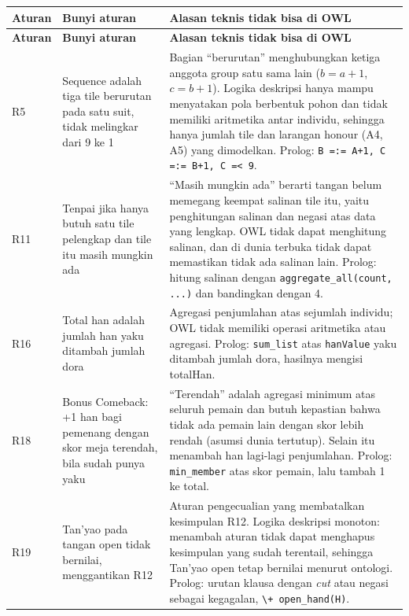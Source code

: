 \documentclass[11pt,a4paper]{article}
\begin{document}
{\small
\begin{longtable}{@{}p{1.4cm} p{5.0cm} p{7.6cm}@{}}
\toprule
\textbf{Aturan} & \textbf{Bunyi aturan} & \textbf{Alasan teknis tidak bisa di OWL} \\
\midrule
\endfirsthead
\toprule
\textbf{Aturan} & \textbf{Bunyi aturan} & \textbf{Alasan teknis tidak bisa di OWL} \\
\midrule
\endhead
R5 & Sequence adalah tiga tile berurutan pada satu suit, tidak melingkar dari 9 ke 1 & Bagian ``berurutan'' menghubungkan ketiga anggota group satu sama lain ($b = a+1$, $c = b+1$). Logika deskripsi hanya mampu menyatakan pola berbentuk pohon dan tidak memiliki aritmetika antar individu, sehingga hanya jumlah tile dan larangan honour (A4, A5) yang dimodelkan. Prolog: \texttt{B =:= A+1, C =:= B+1, C =< 9}. \\
R11 & Tenpai jika hanya butuh satu tile pelengkap dan tile itu masih mungkin ada & ``Masih mungkin ada'' berarti tangan belum memegang keempat salinan tile itu, yaitu penghitungan salinan dan negasi atas data yang lengkap. OWL tidak dapat menghitung salinan, dan di dunia terbuka tidak dapat memastikan tidak ada salinan lain. Prolog: hitung salinan dengan \texttt{aggregate\_all(count, ...)} dan bandingkan dengan 4. \\
R16 & Total han adalah jumlah han yaku ditambah jumlah dora & Agregasi penjumlahan atas sejumlah individu; OWL tidak memiliki operasi aritmetika atau agregasi. Prolog: \texttt{sum\_list} atas \texttt{hanValue} yaku ditambah jumlah dora, hasilnya mengisi totalHan. \\
R18 & Bonus Comeback: +1 han bagi pemenang dengan skor meja terendah, bila sudah punya yaku & ``Terendah'' adalah agregasi minimum atas seluruh pemain dan butuh kepastian bahwa tidak ada pemain lain dengan skor lebih rendah (asumsi dunia tertutup). Selain itu menambah han lagi-lagi penjumlahan. Prolog: \texttt{min\_member} atas skor pemain, lalu tambah 1 ke total. \\
R19 & Tan'yao pada tangan open tidak bernilai, menggantikan R12 & Aturan pengecualian yang membatalkan kesimpulan R12. Logika deskripsi monoton: menambah aturan tidak dapat menghapus kesimpulan yang sudah terentail, sehingga Tan'yao open tetap bernilai menurut ontologi. Prolog: urutan klausa dengan \emph{cut} atau negasi sebagai kegagalan, \texttt{\textbackslash+ open\_hand(H)}. \\
\midrule
\bottomrule
\end{longtable}
}

\end{document}
